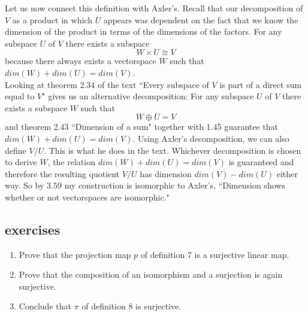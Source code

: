 \documentclass{article}
\theoremstyle{problemstyle}
\begin{document}
Let us now connect this definition with Axler's. Recall that our decomposition of $V$ as a product in which $U$ appears was dependent on the fact that we know the dimension of the product in terms of the dimensions of the factors. For any subspace $U$ of $V$ there exists a subspace $$W \times U \cong V$$ because there always exists a vectorspace $W$ such that $dim(W)+dim(U) = dim(V)$.\\

Looking at theorem 2.34 of the text ``Every subspace of $V$ is part of a direct sum equal to $V$" gives us an alternative decomposition: For any subspace $U$ of $V$ there exists a subspace $W$ such that $$W \oplus U = V$$ and theorem 2.43 ``Dimension of a sum" together with 1.45 guarantee that $dim(W)+dim(U) = dim(V)$. Using Axler's decomposition, we can also define $V/U$. This is what he does in the text. Whichever decomposition is chosen to derive $W$, the relation $dim(W)+dim(U) = dim(V)$ is guaranteed and therefore the resulting quotient $V/U$ has dimension $dim(V)-dim(U)$ either way.  So by $3.59$ my construction is isomorphic to Axler's, ``Dimension shows whether or not vectorspaces are isomorphic."  

\subsection*{exercises}
\begin{enumerate}
\item Prove that the projection map $p$ of definition 7 is a surjective linear map.
\item Prove that the composition of an isomorphism and a surjection is again surjective. 
\item Conclude that $\pi$ of definition 8 is surjective. 
\end{enumerate}


 
\end{document}

